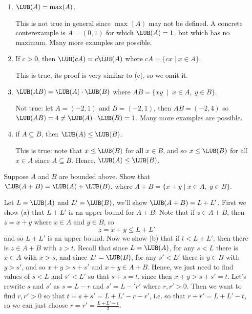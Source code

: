 \documentclass[11pt,dvipsnames]{book}
\numberwithin{figure}{section} %
\numberwithin{table}{section} %
\begin{document}
\begin{exercise}
\begin{enumerate}[label=(\alph*)]
\begin{solution}
\end{solution}
\item $\LUB(A)=\max(A)$.
\begin{solution}
This is not true in general since $\max(A)$ may not be defined. A concrete conterexample is $A = (0,1)$ for which $\LUB(A) =1$, but which has no maximum. Many more examples are possible.
\end{solution}
\item If $c>0$, then $\LUB(cA)=c\LUB(A)$ where $cA=\{cx\; | \; x\in A\}$.
\begin{solution}
This is true, its proof is very similar to (c), so we omit it.
\end{solution}

\item $\LUB(AB)=\LUB(A)\cdot \LUB(B)$ where $AB=\{xy \;\; | \;\; x\in A,\; y\in B\}$.
\begin{solution}
Not true: let $A=(-2,1)$ and $B=(-2,1)$, then $AB=(-2,4)$ so $\LUB(AB)=4\neq \LUB(A)\cdot \LUB(B)=1$. Many more examples are possible.
\end{solution}
\item if $A\subseteq B$, then $\LUB(A)\leq \LUB(B)$.
\begin{solution}
This is true: note that $x\leq \LUB(B)$ for all $x\in B$, and so $x\leq \LUB(B)$ for all $x\in A$ since $A\subseteq B$. Hence, $\LUB(A)\leq \LUB(B)$.
\end{solution}
\end{enumerate}

\end{exercise}

\begin{exercise}
Suppose $A$ and $B$ are bounded above. Show that $\LUB(A+B)=\LUB(A)+\LUB(B)$, where $A+B=\{x+y\; | \; x\in A,\; y\in B\}$.
\begin{solution}
Let $L=\LUB(A)$ and $L'=\LUB(B)$, we'll show $\LUB(A+B)=L+L'$. First we show (a) that $L+L'$ is an upper bound for $A+B$: Note that if $z\in A+B$, then $z=x+y$ where $x\in A$ and $y\in B$, so
\[
z=x+y\leq L+L'
\]
and so $L+L'$ is an upper bound. Now we show (b) that if $t<L+L'$, then there is $z\in A+B$ with $z>t$. Recall that since $L=\LUB(A)$, for any $s<L$ there is $x\in A$ with $x>s$, and since $L'=\LUB(B)$, for any $s'<L'$ there is $y\in B$ with $y>s'$, and so $x+y>s+s'$ and $x+y\in A+B$. Hence, we just need to find values of $s<L$ and $s'<L'$ so that $s+s= t$, since then $x+y>s+s'= t$. Let's rewrite $s$ and $s'$ as $s=L-r$ and $s'=L-'r'$ where $r,r'>0$. Then we want to find $r,r'>0$ so that $t=s+s'=L+L'-r-r'$, i.e. so that $r+r'=L+L'-t$, so we can just choose $r=r'=\frac{L+L'-t}{2}$.
\end{solution}
\end{exercise}
\end{document}

